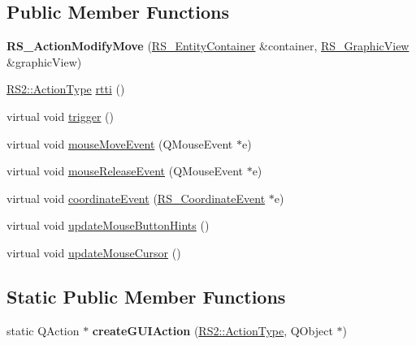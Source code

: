 \subsection*{Public Member Functions}
\begin{DoxyCompactItemize}
\item 
\hypertarget{classRS__ActionModifyMove_ac1197e049d7fb59e329de40c41d9c3fe}{{\bfseries R\-S\-\_\-\-Action\-Modify\-Move} (\hyperlink{classRS__EntityContainer}{R\-S\-\_\-\-Entity\-Container} \&container, \hyperlink{classRS__GraphicView}{R\-S\-\_\-\-Graphic\-View} \&graphic\-View)}\label{classRS__ActionModifyMove_ac1197e049d7fb59e329de40c41d9c3fe}

\item 
\hyperlink{classRS2_afe3523e0bc41fd637b892321cfc4b9d7}{R\-S2\-::\-Action\-Type} \hyperlink{classRS__ActionModifyMove_a8915375fbb5c6b6941034ff80c3c5c53}{rtti} ()
\item 
virtual void \hyperlink{classRS__ActionModifyMove_a0c3e5ff9dd29d49f11f599ca5d72b1f4}{trigger} ()
\item 
virtual void \hyperlink{classRS__ActionModifyMove_af0a4ec072d6b68438d4fbaa4ff58db11}{mouse\-Move\-Event} (Q\-Mouse\-Event $\ast$e)
\item 
virtual void \hyperlink{classRS__ActionModifyMove_aa13b8459e0c078a45a8181d5c564e1f8}{mouse\-Release\-Event} (Q\-Mouse\-Event $\ast$e)
\item 
virtual void \hyperlink{classRS__ActionModifyMove_a425b07099e02828a773581ec82ceb354}{coordinate\-Event} (\hyperlink{classRS__CoordinateEvent}{R\-S\-\_\-\-Coordinate\-Event} $\ast$e)
\item 
virtual void \hyperlink{classRS__ActionModifyMove_a0b90daa3daf481c27d2e8e81b949bf01}{update\-Mouse\-Button\-Hints} ()
\item 
virtual void \hyperlink{classRS__ActionModifyMove_a8405d8454ca2bd96812adcfdf13d9e1f}{update\-Mouse\-Cursor} ()
\end{DoxyCompactItemize}
\subsection*{Static Public Member Functions}
\begin{DoxyCompactItemize}
\item 
\hypertarget{classRS__ActionModifyMove_a783675185f24f3d2337d630644742fe2}{static Q\-Action $\ast$ {\bfseries create\-G\-U\-I\-Action} (\hyperlink{classRS2_afe3523e0bc41fd637b892321cfc4b9d7}{R\-S2\-::\-Action\-Type}, Q\-Object $\ast$)}\label{classRS__ActionModifyMove_a783675185f24f3d2337d630644742fe2}

\end{DoxyCompactItemize}
